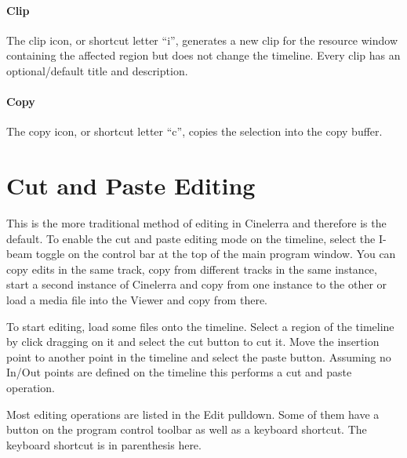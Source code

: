 \paragraph{Clip} The clip icon, or shortcut letter “i”, generates a new clip for the resource window containing the affected region but does not change the timeline.  Every clip has an optional/default title and description.

\paragraph{Copy} The copy icon, or shortcut letter “c”, copies the selection into the copy buffer.

\section{Cut and Paste Editing}%
\label{sec:cut_paste_editing}

This is the more traditional method of editing in Cinelerra and therefore is the default.  To enable the cut and paste editing mode on the timeline, select the I-beam toggle on the control bar at the top of the main program window. You can copy edits in the same track, copy from different tracks in the same instance, start a second instance of Cinelerra and copy from one instance to the other or load a media file into the Viewer and copy from there.

To start editing, load some files onto the timeline.  Select a region of the timeline by click dragging on it and select the cut button to cut it. Move the insertion point to another point in the timeline and select the paste button.  Assuming no In/Out points are defined on the timeline this performs a cut and paste operation.

Most editing operations are listed in the Edit pulldown. Some of them have a button on the program control toolbar as well as a keyboard shortcut.  The keyboard shortcut is in parenthesis here.

